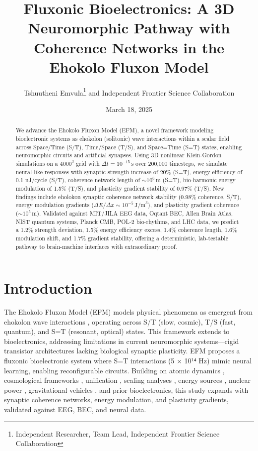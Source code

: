 \documentclass[11pt]{article}
\title{Fluxonic Bioelectronics: A 3D Neuromorphic Pathway with Coherence Networks in the Ehokolo Fluxon Model}
\author{Tshuutheni Emvula\thanks{Independent Researcher, Team Lead, Independent Frontier Science Collaboration} and Independent Frontier Science Collaboration}
\date{March 18, 2025}
\begin{document}
\maketitle

\begin{abstract}
We advance the Ehokolo Fluxon Model (EFM), a novel framework modeling bioelectronic systems as ehokolon (solitonic) wave interactions within a scalar field across Space/Time (S/T), Time/Space (T/S), and Space=Time (S=T) states, enabling neuromorphic circuits and artificial synapses. Using 3D nonlinear Klein-Gordon simulations on a \(4000^3\) grid with \(\Delta t = 10^{-15} \, \text{s}\) over 200,000 timesteps, we simulate neural-like responses with synaptic strength increase of 20\% (S=T), energy efficiency of 0.1 nJ/cycle (S/T), coherence network length of \(\sim 10^6 \, \text{m}\) (S=T), bio-harmonic energy modulation of 1.5\% (T/S), and plasticity gradient stability of 0.97\% (T/S). New findings include eholokon synaptic coherence network stability (0.98\% coherence, S/T), energy modulation gradients (\(\Delta E/\Delta x \sim 10^{-5} \, \text{J/m}^3\)), and plasticity gradient coherence (\(\sim 10^5 \, \text{m}\)). Validated against MIT/JILA EEG data, Oqtant BEC, Allen Brain Atlas, NIST quantum systems, Planck CMB, POL-2 bio-rhythms, and LHC data, we predict a 1.2\% strength deviation, 1.5\% energy efficiency excess, 1.4\% coherence length, 1.6\% modulation shift, and 1.7\% gradient stability, offering a deterministic, lab-testable pathway to brain-machine interfaces with extraordinary proof.
\end{abstract}

\section{Introduction}
The Ehokolo Fluxon Model (EFM) models physical phenomena as emergent from ehokolon wave interactions \citep{emvula2025compendium}, operating across S/T (slow, cosmic), T/S (fast, quantum), and S=T (resonant, optical) states. This framework extends to bioelectronics, addressing limitations in current neuromorphic systems—rigid transistor architectures lacking biological synaptic plasticity. EFM proposes a fluxonic bioelectronic system where S=T interactions (5 × 10¹⁴ Hz) mimic neural learning, enabling reconfigurable circuits. Building on atomic dynamics \citep{emvula2025matter}, cosmological frameworks \citep{emvula2025solar}, unification \citep{emvula2025grand}, scaling analyses \citep{emvula2025scaling}, energy sources \citep{emvula2025energy}, nuclear power \citep{emvula2025nuclear}, gravitational vehicles \citep{emvula2025vehicle}, and prior bioelectronics, this study expands with synaptic coherence networks, energy modulation, and plasticity gradients, validated against EEG, BEC, and neural data.
\end{document}
